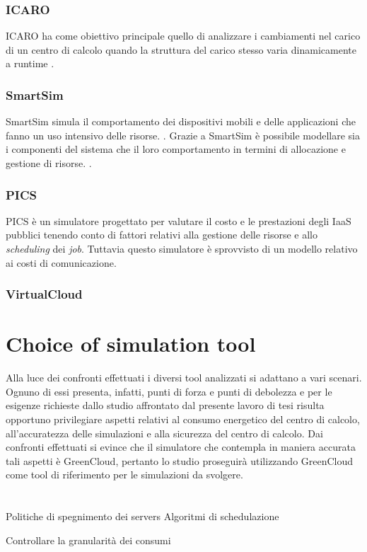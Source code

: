 {\subsubsection{ICARO}
ICARO \cite{badii2016icaro} ha come obiettivo principale quello di analizzare i cambiamenti nel carico di un centro di calcolo quando la struttura del carico stesso varia dinamicamente a runtime \cite{khalil2017cloud}. 
\subsubsection{SmartSim}
SmartSim \cite{shiraz2012extendable} simula il comportamento dei dispositivi mobili e delle applicazioni che fanno un uso intensivo delle risorse. \cite{khalil2017cloud}. Grazie a SmartSim è possibile modellare sia i componenti del sistema che il loro comportamento in termini di allocazione e gestione di risorse. \cite{suryateja2016comparative}.
\subsubsection{PICS}
PICS \cite{kim2015pics} è un simulatore progettato per valutare il costo e le prestazioni degli IaaS pubblici tenendo conto di fattori relativi alla gestione delle risorse e allo \emph{scheduling} dei \emph{job}. Tuttavia questo simulatore è sprovvisto di un modello relativo ai costi di comunicazione. \cite{suryateja2016comparative}
\subsubsection{VirtualCloud}

\section{Choice of simulation tool}
Alla luce dei confronti effettuati i diversi tool analizzati si adattano a vari scenari. Ognuno di essi presenta, infatti, punti di forza e punti di debolezza e per le esigenze richieste dallo studio affrontato dal presente lavoro di tesi risulta opportuno privilegiare aspetti relativi al consumo energetico del centro di calcolo, all'accuratezza delle simulazioni e alla sicurezza del centro di calcolo. Dai confronti effettuati si evince che il simulatore che contempla in maniera accurata tali aspetti è GreenCloud, pertanto lo studio proseguirà utilizzando GreenCloud come tool di riferimento per le simulazioni da svolgere. 

\section{}

}

Politiche di spegnimento dei servers
Algoritmi di schedulazione

Controllare la granularità dei consumi 